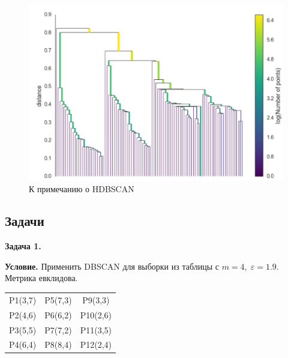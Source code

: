 \begin{figure}[ht!]
    \centering
    \includegraphics[width=0.6\linewidth]{chapters/clustering/images/hdbscan_dendrogramm.png}
    \caption{К примечанию о HDBSCAN}
    \label{fig:hdbdendro}
\end{figure}
\subsection{Задачи}
\textbf{Задача 1.}

\textbf{Условие.} Применить DBSCAN для выборки из таблицы с $m=4,\;\varepsilon=1.9$. Метрика евклидова.

\begin{center}
    \begin{tabular}{ |c|c|c| }
        \hline
        P1(3,7) & P5(7,3) & P9(3,3)  \\ 
        P2(4,6) & P6(6,2) & P10(2,6) \\ 
        P3(5,5) & P7(7,2) & P11(3,5) \\ 
        P4(6,4) & P8(8,4) & P12(2,4) \\ 
        \hline
    \end{tabular}
\end{center}

